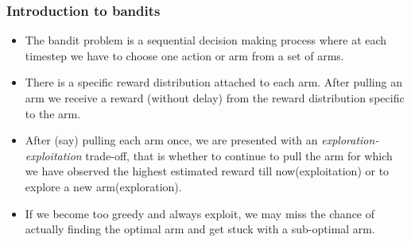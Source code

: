 \begin{frame}
\frametitle{Introduction to bandits}
\begin{itemize}
\item<1-> The bandit problem is a sequential decision making process where at each timestep we have to choose one action or arm from a set of arms.
\item<2-> There is a specific reward distribution attached to each arm.  After pulling an arm we receive a reward (without delay) from the reward distribution specific to the arm. 
\item<3-> After (say) pulling each arm once, we are presented with an \emph{exploration-exploitation}  trade-off, that is whether to continue to pull the arm for which we have observed the highest estimated reward till now(exploitation) or to explore a new arm(exploration). 
\item<4-> If we become too greedy and always exploit, we may miss the chance of actually finding the optimal arm and get stuck with a sub-optimal arm.
\end{itemize}
\end{frame}


